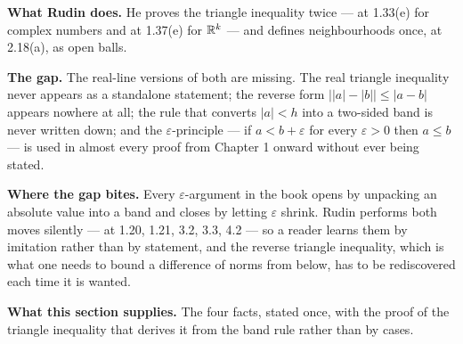 \begin{center}
\end{center}


\begin{roadmap}
\raggedright
\textbf{What Rudin does.} He proves the triangle inequality twice --- at
1.33(e) for complex numbers and at 1.37(e) for $\mathbb{R}^k$ --- and defines
neighbourhoods once, at 2.18(a), as open balls.

\smallskip
\textbf{The gap.} The real-line versions of both are missing. The real
triangle inequality never appears as a standalone statement; the reverse
form $\bigl||a|-|b|\bigr| \le |a-b|$ appears nowhere at all; the rule that
converts $|a| < h$ into a two-sided band is never written down; and the
$\varepsilon$-principle --- if $a < b + \varepsilon$ for every
$\varepsilon>0$ then $a \le b$ --- is used in almost every proof from
Chapter 1 onward without ever being stated.

\smallskip
\textbf{Where the gap bites.} Every $\varepsilon$-argument in the book opens
by unpacking an absolute value into a band and closes by letting
$\varepsilon$ shrink. Rudin performs both moves silently --- at 1.20, 1.21,
3.2, 3.3, 4.2 --- so a reader learns them by imitation rather than by
statement, and the reverse triangle inequality, which is what one needs to
bound a difference of norms from below, has to be rediscovered each time it
is wanted.

\smallskip
\textbf{What this section supplies.} The four facts, stated once, with the
proof of the triangle inequality that derives it from the band rule rather
than by cases.
\end{roadmap}


